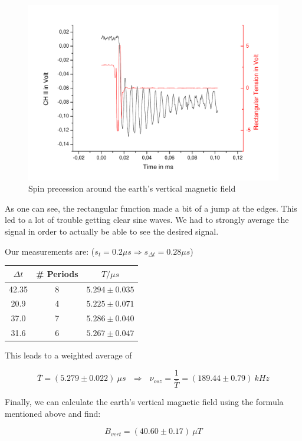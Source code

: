 \begin{figure}[H]
\centering \includegraphics[width=\textwidth]{BilderAusw/Spinpr.pdf}
\caption{Spin precession around the earth's vertical magnetic field}
\end{figure}

As one can see, the rectangular function made a bit of a jump at the edges. This led to a lot of trouble getting clear sine waves. We had to strongly average the signal in order to actually be able to see the desired signal.

Our measurements are: ($s_t = 0.2 \mu s \Rightarrow s_{\Delta t} = 0.28 \mu s$)

\begin{center}
\begin{tabular}[H]{c c c}
$\Delta t$ & \# Periods & $T/\mu s$\\ \hline
42.35 & 8 & $5.294 \pm 0.035$\\
20.9   & 4 & $5.225 \pm 0.071$\\
37.0   & 7 & $5.286 \pm  0.040$\\
31.6   & 6 & $5.267 \pm  0.047$\\
\end{tabular}
\end{center}

This leads to a weighted average of

$$ \bar T = (5.279 \pm 0.022)\ \mu s \ \ \ \Rightarrow \ \ \ \nu_{osz}=\frac{1}{\bar T}= (189.44 \pm 0.79)\ kHz$$

Finally, we can calculate the earth's vertical magnetic field using the formula mentioned above and find:

$$\boxed{ B_{vert} = (40.60 \pm 0.17)\ \mu T }$$\\

